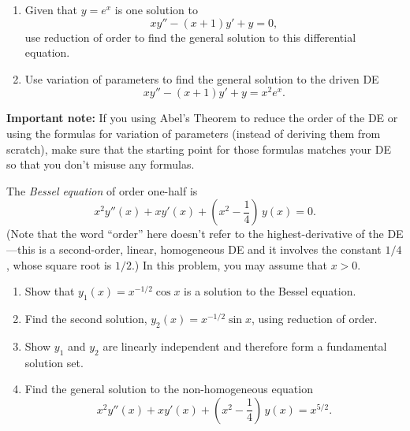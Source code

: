 \documentclass[12pt,letterpaper]{hmcpset}
\begin{document}

\begin{problem}[1]
    \begin{enumerate}\item Given that $y=e^{x}$ is one solution to
        $$x y''-(x+1)y'+y=0,$$
        use reduction of order to find the general solution to this differential equation.
    \item Use variation of parameters to find the general solution to the driven DE
        $$x y''-(x+1)y'+y=x^2e^x.$$
\end{enumerate}
\textbf{Important note:} If you using Abel's Theorem to reduce the order of the DE or using the formulas for variation of parameters (instead of deriving them from scratch), make sure that the starting point for those formulas matches your DE so that you don't misuse any formulas.
\end{problem}

\begin{solution}
    \vfill
\end{solution}
\newpage

\begin{problem}[2]
    The \emph{Bessel equation} of order one-half is 
    $$ x^2 y''(x) + x y'(x) + \left( x^2 - \frac{1}{4} \right) \, y(x) = 0.$$
    (Note that the word ``order'' here doesn't refer to the highest-derivative of the DE---this is a second-order, linear, homogeneous DE and it involves the constant $1/4$, whose square root is $1/2$.) In this problem, you may assume that $x>0$.
    \begin{enumerate}
        \item Show that $y_1(x) = x^{-1/2} \cos{x}$ is a solution to the Bessel equation.
        \item Find the second solution, $y_2(x) = x^{-1/2} \sin{x}$, using reduction of order.
        \item Show $y_1$ and $y_2$ are linearly independent and therefore form a fundamental solution set.
        \item Find the general solution to the non-homogeneous equation
            $$ x^2 y''(x) + x y'(x) + \left( x^2 - \frac{1}{4} \right) \, y(x) = x^{5/2} .$$
    \end{enumerate}
\end{problem}

\begin{solution}
    \vfill
\end{solution}
\newpage
\end{document}
